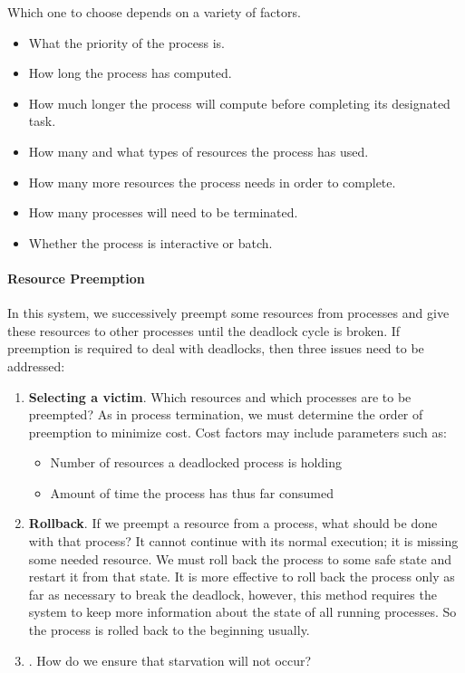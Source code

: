 Which one to choose depends on a variety of factors.
\begin{itemize}[noitemsep]
\item What the priority of the process is.
\item How long the process has computed.
\item How much longer the process will compute before completing its designated task.
\item How many and what types of resources the process has used.
\item How many more resources the process needs in order to complete.
\item How many processes will need to be terminated.
\item Whether the process is interactive or batch.
\end{itemize}

\paragraph{Resource Preemption}\label{par:Deadlock_recovery-Resource_Preemption}
In this system, we successively preempt some resources from processes and give these resources to other processes until the deadlock cycle is broken.
If preemption is required to deal with deadlocks, then three issues need to be addressed:
\begin{enumerate}[noitemsep]
\item \textbf{Selecting a victim}.
  Which resources and which processes are to be preempted?
  As in process termination, we must determine the order of preemption to minimize cost.
  Cost factors may include parameters such as:
  \begin{itemize}[noitemsep]
  \item Number of resources a deadlocked process is holding
  \item Amount of time the process has thus far consumed
  \end{itemize}

\item \textbf{Rollback}.
  If we preempt a resource from a process, what should be done with that process?
  It cannot continue with its normal execution; it is missing some needed resource.
  We must roll back the process to some safe state and restart it from that state.
  It is more effective to roll back the process only as far as necessary to break the deadlock, however, this method requires the system to keep more information about the state of all running processes.
  So the process is rolled back to the beginning usually.
\item \textbf{}.
  How do we ensure that starvation will not occur?
\end{enumerate}

